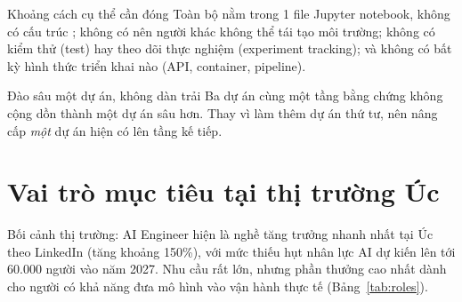 \documentclass{reportkit}
\begin{document}
\begin{diagram}[
  type=network,
  caption={Vị trí hiện tại của portfolio so với mục tiêu cần đạt.},
  label={fig:portfolio},
  source={Minh họa khái niệm dựa trên thang mức độ thực tế của dự án.},
  description={Năm mức độ theo thứ tự, vị trí hiện tại được đánh dấu ở mức Independent, mục tiêu ở mức Professionally realistic.}
]
\end{diagram}

\begin{limitationnote}{Khoảng cách cụ thể cần đóng}
Toàn bộ nằm trong 1 file Jupyter notebook, không có cấu trúc ; không có
 nên người khác không thể tái tạo môi trường; không có kiểm
thử (test) hay theo dõi thực nghiệm (experiment tracking); và không có bất kỳ hình
thức triển khai nào (API, container, pipeline).
\end{limitationnote}

\begin{principle}{Đào sâu một dự án, không dàn trải}
Ba dự án cùng một tầng bằng chứng không cộng dồn thành một dự án sâu hơn. Thay vì làm
thêm dự án thứ tư, nên nâng cấp \emph{một} dự án hiện có lên tầng kế tiếp.
\end{principle}

\section{Vai trò mục tiêu tại thị trường Úc}
Bối cảnh thị trường: AI Engineer hiện là nghề tăng trưởng nhanh nhất tại Úc theo
LinkedIn (tăng khoảng 150\%), với mức thiếu hụt nhân lực AI dự kiến lên tới 60.000
người vào năm 2027. Nhu cầu rất lớn, nhưng phần thưởng cao nhất dành cho người có khả
năng đưa mô hình vào vận hành thực tế (Bảng~\ref{tab:roles}).
\end{document}
